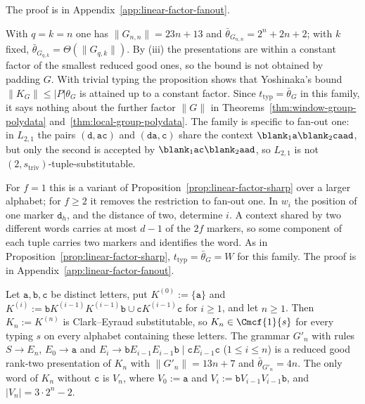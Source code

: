 The proof is in Appendix~\ref{app:linear-factor-fanout}.

With $q=k=n$ one has $\|G_{n,n}\|=23n+13$ and $\bar\theta_{G_{n,n}}=2^n+2n+2$;
with $k$ fixed, $\bar\theta_{G_{q,k}}=\Theta(\|G_{q,k}\|)$.  By (iii) the
presentations are within a constant factor of the smallest reduced good ones,
so the bound is not obtained by padding $G$.  With trivial typing the
proposition shows that Yoshinaka's bound $\|K_G\|\le|P|\theta_G$ is attained
up to a constant factor.  Since $t_{\mathrm{typ}}=\bar\theta_G$ in this family,
it says nothing about the further factor $\|G\|$ in
Theorems~\ref{thm:window-group-polydata} and~\ref{thm:local-group-polydata}.
The family is specific to fan-out one: in $L_{2,1}$ the pairs
$(\mathtt d,\mathtt{ac})$ and $(\mathtt{da},\mathtt c)$ share the context
$\blank_1\mathtt a\blank_2\mathtt{caad}$, but only the second is accepted by
$\blank_1\mathtt{ac}\blank_2\mathtt{aad}$, so $L_{2,1}$ is not
$(2,s_{\mathrm{triv}})$-tuple-substitutable.

For $f=1$ this is a variant of Proposition~\ref{prop:linear-factor-sharp} over a
larger alphabet; for $f\ge2$ it removes the restriction to fan-out one.  In
$w_i$ the position of one marker $\mathtt d_h$, and the distance of two, determine
$i$.  A context shared by two different words carries at most $d-1$ of the $2f$
markers, so some component of each tuple carries two markers and identifies the
word.  As in Proposition~\ref{prop:linear-factor-sharp},
$t_{\mathrm{typ}}=\bar\theta_G=W$ for this family.  The proof is in
Appendix~\ref{app:linear-factor-fanout}.

\begin{proposition}
\label{prop:three-letter-family}
Let $\mathtt a,\mathtt b,\mathtt c$ be distinct letters, put $K^{(0)}:=\{\mathtt a\}$
and $K^{(i)}:=\mathtt bK^{(i-1)}K^{(i-1)}\mathtt b\cup\mathtt cK^{(i-1)}\mathtt c$ for
$i\ge1$, and let $n\ge1$.  Then $K_n:=K^{(n)}$ is Clark--Eyraud substitutable, so
$K_n\in\Cmcf{1}{s}$ for every typing $s$ on every alphabet containing these
letters.  The grammar $G'_n$ with rules $S\to E_n$, $E_0\to\mathtt a$ and
$E_i\to\mathtt bE_{i-1}E_{i-1}\mathtt b\mid\mathtt cE_{i-1}\mathtt c$
($1\le i\le n$) is a reduced good rank-two presentation of $K_n$ with
$\|G'_n\|=13n+7$ and $\bar\theta_{G'_n}=4n$.  The only word of $K_n$ without
$\mathtt c$ is $V_n$, where $V_0:=\mathtt a$ and
$V_i:=\mathtt bV_{i-1}V_{i-1}\mathtt b$, and $|V_n|=3\cdot2^n-2$.
\end{proposition}

